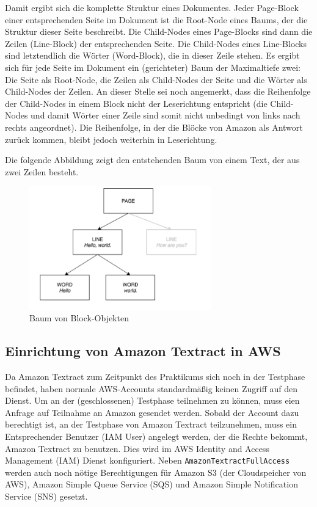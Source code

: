 \documentclass{whswinvcbook}
\begin{document}
Damit ergibt sich die komplette Struktur eines Dokumentes. Jeder Page-Block einer entsprechenden Seite im Dokument ist die Root-Node eines Baums, der die Struktur dieser Seite beschreibt. Die Child-Nodes eines Page-Blocks sind dann die Zeilen (Line-Block) der entsprechenden Seite. Die Child-Nodes eines Line-Blocks sind letztendlich die Wörter (Word-Block), die in dieser Zeile stehen. Es ergibt sich für jede Seite im Dokument ein (gerichteter) Baum der Maximaltiefe zwei: Die Seite als Root-Node, die Zeilen als Child-Nodes der Seite und die Wörter als Child-Nodes der Zeilen. An dieser Stelle sei noch angemerkt, dass die Reihenfolge der Child-Nodes in einem Block nicht der Leserichtung entspricht (die Child-Nodes und damit Wörter einer Zeile sind somit nicht unbedingt von links nach rechts angeordnet). Die Reihenfolge, in der die Blöcke von Amazon als Antwort zurück kommen, bleibt jedoch weiterhin in Leserichtung.

Die folgende Abbildung zeigt den entstehenden Baum von einem Text, der aus zwei Zeilen besteht.
\begin{figure}[h]
    \centering
    \includegraphics[width=0.7\textwidth]{img/textract_tree.png}
    \caption{Baum von Block-Objekten}
    \label{fig-textract-tree}
\end{figure}
\subsection{Einrichtung von Amazon Textract in AWS}
Da Amazon Textract zum Zeitpunkt des Praktikums sich noch in der Testphase befindet, haben normale AWS-Accounts standardmäßig keinen Zugriff auf den Dienst. Um an der (geschlossenen) Testphase teilnehmen zu können, muss eien Anfrage auf Teilnahme an Amazon gesendet werden. Sobald der Account dazu berechtigt ist, an der Testphase von Amazon Textract teilzunehmen, muss ein Entsprechender Benutzer (IAM User) angelegt werden, der die Rechte bekommt, Amazon Textract zu benutzen. Dies wird im AWS Identity and Access Management (IAM) Dienst konfiguriert. Neben \texttt{AmazonTextractFullAccess} werden auch noch nötige Berechtigungen für Amazon S3 (der Cloudspeicher von AWS), Amazon Simple Queue Service (SQS) und Amazon Simple Notification Service (SNS) gesetzt.
\end{document}
